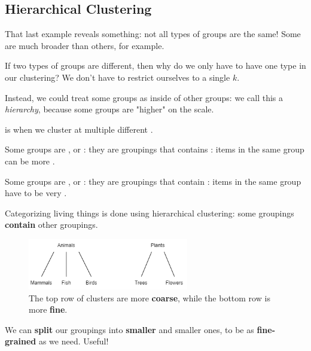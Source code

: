 
    \subsection*{Hierarchical Clustering}
    
        That last example reveals something: not all types of groups are the same! Some are much broader than others, for example.
        
        If two types of groups are different, then why do we only have to have one type in our clustering? We don't have to restrict ourselves to a single $k$.
        
        Instead, we could treat some groups as inside of other groups: we call this a \textit{hierarchy}, because some groups are "higher" on the scale.\\
        
        \begin{definition}
             is when we cluster at multiple different . 
            
            Some groups are , or : they are groupings that contains : items in the same group can be more .
            
            Some groups are , or : they are groupings that contain : items in the same group have to be very .
        \end{definition}
        
        \miniex Categorizing living things is done using hierarchical clustering: some groupings \textbf{contain} other groupings.
        
        \begin{figure}[H]
            \centering
            \includegraphics[width=70mm,scale=0.4]{images/clustering_images/hierarchical_life.png}
            \caption*{The top row of clusters are more \textbf{coarse}, while the bottom row is more \textbf{fine}.}
        \end{figure}
        
        We can \textbf{split} our groupings into \textbf{smaller} and smaller ones, to be as \textbf{fine-grained} as we need. Useful!
